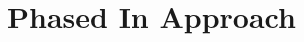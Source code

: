 \documentclass[11pt, aspectratio=169]{beamer}
\newcommand{\highlite}[1]{{\color{Carnellian} #1}}
\begin{document}



\section{Phased In Approach}
\end{document}

